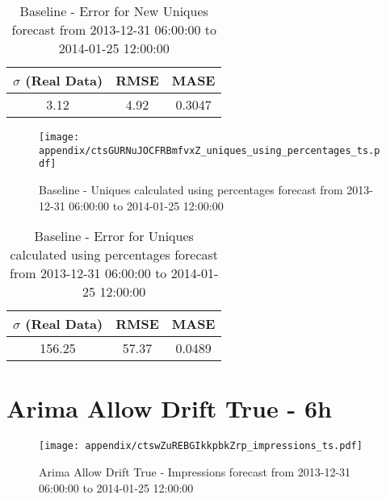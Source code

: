\begin{table}[H]
\centering
\footnotesize
\begin{tabular}{ccc}
$\sigma$ (Real Data) & RMSE & MASE   \\ \hline
3.12 & 4.92 & 0.3047 \\
\end{tabular}

\vspace{0.5cm}

\caption[]{
Baseline - Error for New Uniques forecast from 2013-12-31 06:00:00 to 2014-01-25 12:00:00}
\end{table}

\begin{figure}[H] \begin{center} \leavevmode
\texttt{[image: appendix/ctsGURNuJOCFRBmfvxZ\_uniques\_using\_percentages\_ts.pdf]} \caption[]{
Baseline - Uniques calculated using percentages forecast from 2013-12-31 06:00:00 to 2014-01-25 12:00:00} \label{fig:appendix/ctsGURNuJOCFRBmfvxZ_uniques_using_percentages_ts.pdf} \end{center}
\end{figure}

\begin{table}[H]
\centering
\footnotesize
\begin{tabular}{ccc}
$\sigma$ (Real Data) & RMSE & MASE   \\ \hline
156.25 & 57.37 & 0.0489 \\
\end{tabular}

\vspace{0.5cm}

\caption[]{
Baseline - Error for Uniques calculated using percentages forecast from 2013-12-31 06:00:00 to 2014-01-25 12:00:00}
\end{table}

\section{Arima Allow Drift True - 6h}
\begin{figure}[H] \begin{center} \leavevmode
\texttt{[image: appendix/ctswZuREBGIkkpbkZrp\_impressions\_ts.pdf]} \caption[]{
Arima Allow Drift True - Impressions forecast from 2013-12-31 06:00:00 to 2014-01-25 12:00:00} \label{fig:appendix/ctswZuREBGIkkpbkZrp_impressions_ts.pdf} \end{center}
\end{figure}

